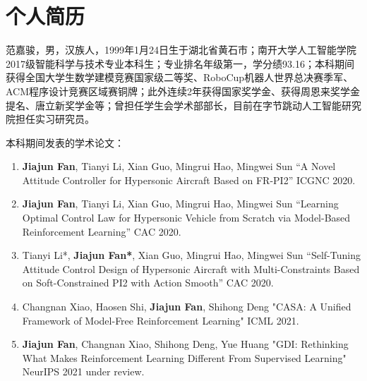 

\chapter*{个人简历}

范嘉骏，男，汉族人，1999年1月24日生于湖北省黄石市；南开大学人工智能学院2017级智能科学与技术专业本科生；专业排名年级第一，学分绩93.16；本科期间获得全国大学生数学建模竞赛国家级二等奖、RoboCup机器人世界总决赛季军、ACM程序设计竞赛区域赛铜牌；此外连续2年获得国家奖学金、获得周恩来奖学金提名、唐立新奖学金等；曾担任学生会学术部部长，目前在字节跳动人工智能研究院担任实习研究员。


本科期间发表的学术论文：
\begin{enumerate}
\item \textbf{Jiajun Fan}, Tianyi Li, Xian Guo, Mingrui Hao, Mingwei Sun “A Novel Attitude Controller for Hypersonic Aircraft Based on FR-PI2” ICGNC 2020.

\item \textbf{Jiajun Fan}, Tianyi Li, Xian Guo, Mingrui Hao, Mingwei Sun “Learning Optimal Control Law  for Hypersonic Vehicle from Scratch via Model-Based Reinforcement Learning” CAC 2020.

\item Tianyi Li*,  \textbf{Jiajun Fan*},  Xian Guo, Mingrui Hao, Mingwei Sun “Self-Tuning Attitude Control Design of Hypersonic Aircraft with Multi-Constraints Based on Soft-Constrained PI2 with Action Smooth” CAC 2020.

\item Changnan Xiao, Haosen Shi, \textbf{Jiajun Fan}, Shihong Deng "CASA: A Unified Framework of Model-Free Reinforcement Learning" ICML 2021.

\item \textbf{Jiajun Fan}, Changnan Xiao, Shihong Deng, Yue Huang "GDI: Rethinking What Makes Reinforcement Learning Different From Supervised Learning" NeurIPS 2021 under review.

\end{enumerate}




